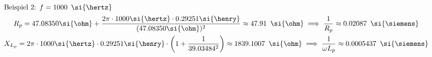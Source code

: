 \documentclass[a4paper, 12pt]{article}
\begin{document}
      \begin{gather*}
        \intertext{Beispiel 2: $f = 1000 \,\ \si{\hertz}$}
        R_p = 47.08350 \si{\ohm} + \frac{2 \pi \cdot 1000 \si{\hertz} \cdot 0.29251 \si{\henry}}{(47.08350 \si{\ohm})^2} \approx 47.91 \,\ \si{\ohm} \implies \frac{1}{R_p} \approx 0.02087 \,\ \si{\siemens}\\
        X_{L_{p}} = 2 \pi \cdot 1000 \si{\hertz} \cdot 0.29251 \si{\henry} \cdot \left( 1+\frac{1}{39.03484^2}\right) \approx 1839.1007 \,\ \si{\ohm} \implies \frac{1}{\omega L_p} \approx 0.0005437  \,\ \si{\siemens}
      \end{gather*}

  \subsection{}
\end{document}
